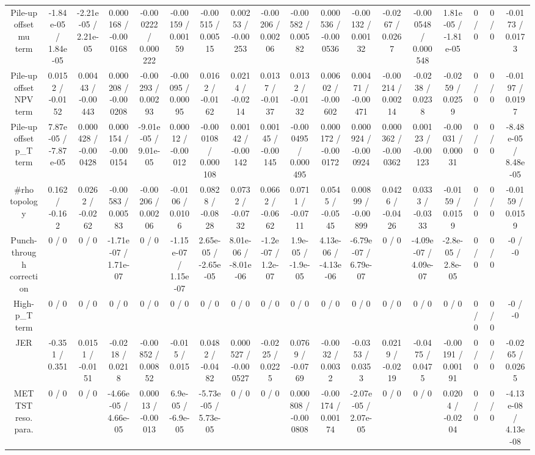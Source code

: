 \documentclass[10pt]{article}
\begin{document}
\begin{table}[htbp]
\begin{center}
\begin{tabular}{|c|c|c|c|c|c|c|c|c|c|c|c|c|c|c|c|c|c|}
  Pile-up offset mu term & -1.84e-05 / 1.84e-05 & -2.21e-05 / 2.21e-05 & 0.000168 / -0.000168 & -0.000222 / 0.000222 & -0.00159 / 0.00159 & -0.00515 / 0.00515 & 0.00253 / -0.00253 & -0.00206 / 0.00206 & -0.00582 / 0.00582 & 0.000536 / -0.000536 & -0.00132 / 0.00132 & -0.0267 / 0.0267 & -0.000548 / 0.000548 & 1.81e-05 / -1.81e-05 & 0 / 0 & 0 / 0 & -0.0173 / 0.0173 \\ 
  Pile-up offset NPV term & 0.0152 / -0.0152 & 0.00443 / -0.00443 & 0.000208 / -0.000208 & -0.00293 / 0.00293 & -0.00095 / 0.00095 & 0.0162 / -0.0162 & 0.0214 / -0.0214 & 0.0137 / -0.0137 & 0.0132 / -0.0132 & 0.00602 / -0.00602 & 0.00471 / -0.00471 & -0.00214 / 0.00214 & -0.0238 / 0.0238 & -0.0259 / 0.0259 & 0 / 0 & 0 / 0 & -0.0197 / 0.0197 \\ 
  Pile-up offset p_{T} term & 7.87e-05 / -7.87e-05 & 0.000428 / -0.000428 & 0.000154 / -0.000154 & -9.01e-05 / 9.01e-05 & 0.00012 / -0.00012 & -0.000108 / 0.000108 & 0.00142 / -0.00142 & 0.00145 / -0.00145 & -0.000495 / 0.000495 & 0.000172 / -0.000172 & 0.000924 / -0.000924 & 0.000362 / -0.000362 & 0.00123 / -0.00123 & -0.00031 / 0.00031 & 0 / 0 & 0 / 0 & -8.48e-05 / 8.48e-05 \\ 
  #rho topology & 0.162 / -0.162 & 0.0262 / -0.0262 & -0.00583 / 0.00583 & -0.00206 / 0.00206 & -0.0106 / 0.0106 & 0.0828 / -0.0828 & 0.0732 / -0.0732 & 0.0662 / -0.0662 & 0.0711 / -0.0711 & 0.0545 / -0.0545 & 0.00899 / -0.00899 & 0.0426 / -0.0426 & 0.0333 / -0.0333 & -0.0159 / 0.0159 & 0 / 0 & 0 / 0 & -0.0159 / 0.0159 \\ 
  Punch-through correction & 0 / 0 & 0 / 0 & -1.71e-07 / 1.71e-07 & 0 / 0 & -1.15e-07 / 1.15e-07 & 2.65e-05 / -2.65e-05 & 8.01e-06 / -8.01e-06 & -1.2e-07 / 1.2e-07 & 1.9e-05 / -1.9e-05 & 4.13e-06 / -4.13e-06 & -6.79e-07 / 6.79e-07 & 0 / 0 & -4.09e-07 / 4.09e-07 & -2.8e-05 / 2.8e-05 & 0 / 0 & 0 / 0 & -0 / -0 \\ 
  High-p_{T} term & 0 / 0 & 0 / 0 & 0 / 0 & 0 / 0 & 0 / 0 & 0 / 0 & 0 / 0 & 0 / 0 & 0 / 0 & 0 / 0 & 0 / 0 & 0 / 0 & 0 / 0 & 0 / 0 & 0 / 0 & 0 / 0 & -0 / -0 \\ 
  JER & -0.351 / 0.351 & 0.0151 / -0.0151 & -0.0218 / 0.0218 & -0.00852 / 0.00852 & -0.015 / 0.015 & 0.0482 / -0.0482 & 0.000527 / -0.000527 & -0.0225 / 0.0225 & 0.0769 / -0.0769 & -0.0032 / 0.0032 & -0.0353 / 0.0353 & 0.0219 / -0.0219 & -0.0475 / 0.0475 & -0.00191 / 0.00191 & 0 / 0 & 0 / 0 & -0.0265 / 0.0265 \\ 
  MET TST reso. para. & 0 / 0 & 0 / 0 & -4.66e-05 / 4.66e-05 & 0.00013 / -0.00013 & 6.9e-05 / -6.9e-05 & -5.73e-05 / 5.73e-05 & 0 / 0 & 0 / 0 & 0.000808 / -0.000808 & -0.00174 / 0.00174 & -2.07e-05 / 2.07e-05 & 0 / 0 & 0 / 0 & 0.0204 / -0.0204 & 0 / 0 & 0 / 0 & -4.13e-08 / 4.13e-08 \\ 

\end{tabular}
\end{center}
\end{table}
\end{document}
